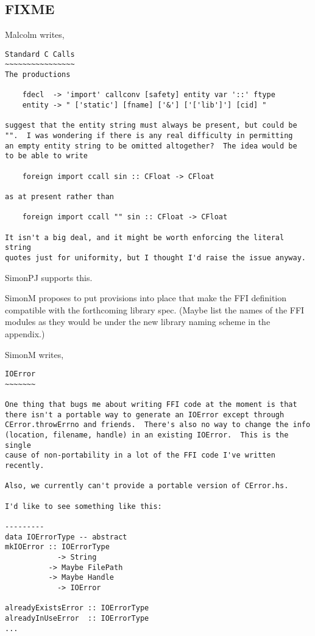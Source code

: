 \documentclass[a4paper,twosides]{article}
\begin{document}
\begin{DRAFT}
\section{FIXME}

Malcolm writes,
%
\begin{verbatim}
Standard C Calls
~~~~~~~~~~~~~~~~
The productions

    fdecl  -> 'import' callconv [safety] entity var '::' ftype
    entity -> " ['static'] [fname] ['&'] ['['lib']'] [cid] "

suggest that the entity string must always be present, but could be
"".  I was wondering if there is any real difficulty in permitting
an empty entity string to be omitted altogether?  The idea would be
to be able to write

    foreign import ccall sin :: CFloat -> CFloat

as at present rather than

    foreign import ccall "" sin :: CFloat -> CFloat

It isn't a big deal, and it might be worth enforcing the literal string
quotes just for uniformity, but I thought I'd raise the issue anyway.
\end{verbatim}
%
SimonPJ supports this.

SimonM proposes to put provisions into place that make the FFI definition
compatible with the forthcoming library spec.  (Maybe list the names of the
FFI modules as they would be under the new library naming scheme in the
appendix.)

SimonM writes,
%
\begin{verbatim}
IOError
~~~~~~~

One thing that bugs me about writing FFI code at the moment is that
there isn't a portable way to generate an IOError except through
CError.throwErrno and friends.  There's also no way to change the info
(location, filename, handle) in an existing IOError.  This is the single
cause of non-portability in a lot of the FFI code I've written recently.

Also, we currently can't provide a portable version of CError.hs.

I'd like to see something like this:

---------
data IOErrorType -- abstract
mkIOError :: IOErrorType
            -> String
          -> Maybe FilePath
          -> Maybe Handle
            -> IOError

alreadyExistsError :: IOErrorType
alreadyInUseError  :: IOErrorType
...


\end{verbatim}
\end{DRAFT}
\end{document}
